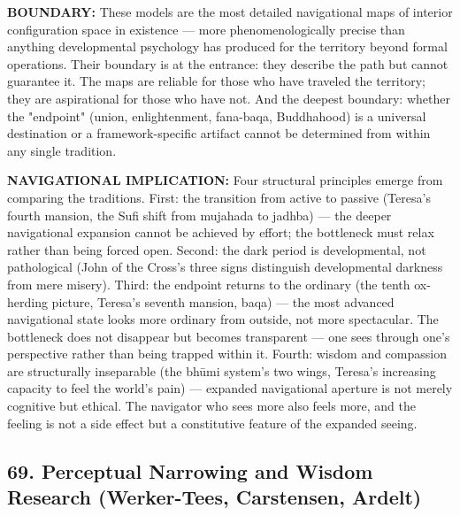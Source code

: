 \textbf{BOUNDARY:} These models are the most detailed navigational maps of interior configuration space in existence — more phenomenologically precise than anything developmental psychology has produced for the territory beyond formal operations. Their boundary is at the entrance: they describe the path but cannot guarantee it. The maps are reliable for those who have traveled the territory; they are aspirational for those who have not. And the deepest boundary: whether the "endpoint" (union, enlightenment, fana-baqa, Buddhahood) is a universal destination or a framework-specific artifact cannot be determined from within any single tradition.


\textbf{NAVIGATIONAL IMPLICATION:} Four structural principles emerge from comparing the traditions. First: the transition from active to passive (Teresa's fourth mansion, the Sufi shift from mujahada to jadhba) — the deeper navigational expansion cannot be achieved by effort; the bottleneck must relax rather than being forced open. Second: the dark period is developmental, not pathological (John of the Cross's three signs distinguish developmental darkness from mere misery). Third: the endpoint returns to the ordinary (the tenth ox-herding picture, Teresa's seventh mansion, baqa) — the most advanced navigational state looks more ordinary from outside, not more spectacular. The bottleneck does not disappear but becomes transparent — one sees through one's perspective rather than being trapped within it. Fourth: wisdom and compassion are structurally inseparable (the bhūmi system's two wings, Teresa's increasing capacity to feel the world's pain) — expanded navigational aperture is not merely cognitive but ethical. The navigator who sees more also feels more, and the feeling is not a side effect but a constitutive feature of the expanded seeing.


\bigskip\noindent\makebox[\textwidth]{\color{rulegray}\rule{5cm}{0.3pt}}\bigskip


\subsection*{69. Perceptual Narrowing and Wisdom Research (Werker-Tees, Carstensen, Ardelt)}


